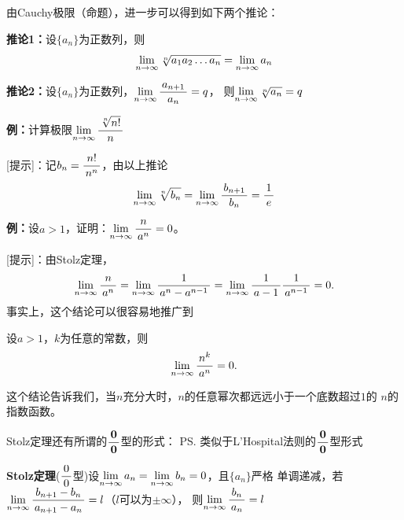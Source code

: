 由Cauchy极限（命题），进一步可以得到如下两个推论：

\begin{thx}
{\bf 推论1：}设$\{a_n\}$为正数列，则
$$\limn\sqrt[n]{a_1a_2\ldots a_n}=\limn a_n$$

{\bf 推论2：}设$\{a_n\}$为正数列，$\limn\df{a_{n+1}}{a_n}=q$，
则$\limn\sqrt[n]{a_n}=q$
\end{thx}

{\bf 例：}计算极限$\limn\df{\sqrt[n]{n!}}{n}$

[提示]：记$b_n=\df{n!}{n^n}$，由以上推论
$$\limn\sqrt[n]{b_n}=\limn\df{b_{n+1}}{b_n}=\df1e$$

{\bf 例：}设$a>1$，证明：$\limn\df{n}{a^n}=0$。

[提示]：由Stolz定理，
$$
	\limn\df{n}{a^n}=\limn\df1{a^n-a^{n-1}}=\limn\df1{a-1}\df1{a^{n-1}}=0.
$$
事实上，这个结论可以很容易地推广到
\begin{thx}
	设$a>1$，$k$为任意的常数，则
	$$\limn\df{n^k}{a^n}=0.$$
\end{thx}
这个结论告诉我们，当$n$充分大时，$n$的任意幂次都远远小于一个底数超过$1$的
$n$的指数函数。

Stolz定理还有所谓的$\df{\bm0}{\bm0}$型的形式：
\ps{类似于L'Hospital法则的$\df{\bm0}{\bm0}$型形式}

\begin{thx}
	{\bf Stolz定理}($\df00$型)设$\limn a_n=\limn b_n=0$，且$\{a_n\}$严格
	单调递减，若$\limn\df{b_{n+1}-b_n}{a_{n+1}-a_n}=l$（$l$可以为$\pm\infty$），
	则$\limn\df{b_n}{a_n}=l$
\end{thx}

